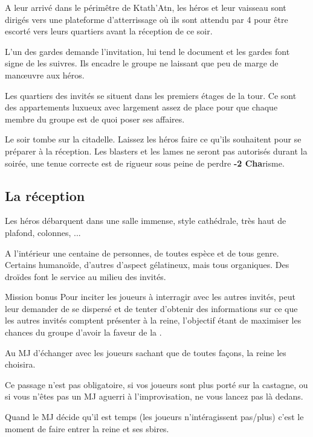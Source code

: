 A leur arrivé dans le périmêtre de Ktath’Atn, les héros et leur vaisseau sont dirigés vers une plateforme d’atterrissage où ils sont attendu par 4  pour être escorté vers leurs quartiers avant la réception de ce soir.

L’un des gardes demande l’invitation,  lui tend le document et les gardes font signe de les suivres. Ils encadre le groupe ne laissant que peu de marge de manœuvre aux héros.

Les quartiers des invités se situent dans les premiers étages de la tour. Ce sont des appartements luxueux avec largement assez de place pour que chaque membre du groupe est de quoi poser ses affaires.

Le soir tombe sur la citadelle. Laissez les héros faire ce qu’ils souhaitent pour se préparer à la réception. Les blasters et les lames ne seront pas autorisés durant la soirée, une tenue correcte est de rigueur sous peine de perdre \textbf{-2 Cha}risme. 

\subsection{La réception}

Les héros débarquent dans une salle immense, style cathédrale, très haut de plafond, colonnes, ... 

A l’intérieur une centaine de personnes, de toutes espèce et de tous genre. Certains humanoïde, d’autres d’aspect gélatineux, mais tous organiques. Des droïdes font le service au milieu des invités. 

\begin{paperbox}{Mission bonus}
Pour inciter les joueurs à interragir avec les autres invités,  peut leur demander de se dispersé et de tenter d’obtenir des informations sur ce que les autres invités comptent présenter à la reine, l’objectif étant de maximiser les chances du groupe d’avoir la faveur de la .

Au MJ d’échanger avec les joueurs sachant que de toutes façons, la reine les choisira. 

Ce passage n’est pas obligatoire, si vos joueurs sont plus porté sur la castagne, ou si vous n’êtes pas un MJ aguerri à l’improvisation, ne vous lancez pas là dedans.
\end{paperbox}

Quand le MJ décide qu’il est temps (les joueurs n’intéragissent pas/plus) c’est le moment de faire entrer la reine et ses sbires.\\

